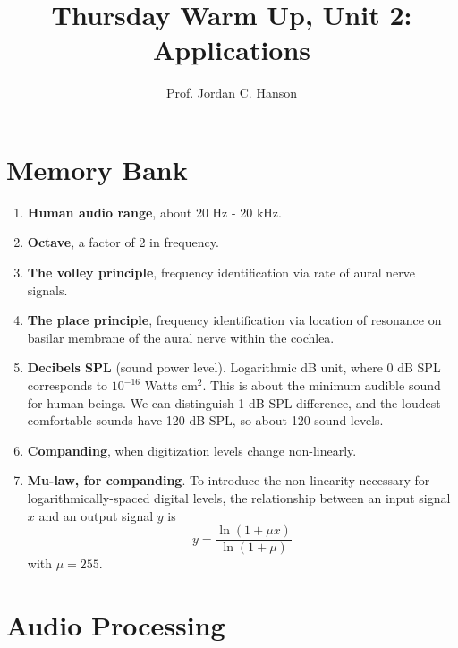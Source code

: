 \documentclass{article}
\begin{document}
\twocolumn
\small

\title{Thursday Warm Up, Unit 2: Applications}
\author{Prof. Jordan C. Hanson}
\maketitle

\section{Memory Bank}

\begin{enumerate}
\item \textbf{Human audio range}, about 20 Hz - 20 kHz.
\item \textbf{Octave}, a factor of 2 in frequency.
\item \textbf{The volley principle}, frequency identification via rate of aural nerve signals.
\item \textbf{The place principle}, frequency identification via location of resonance on basilar membrane of the aural nerve within the cochlea.
\item \textbf{Decibels SPL} (sound power level). Logarithmic dB unit, where 0 dB SPL corresponds to $10^{-16}$ Watts cm$^2$.  This is about the minimum audible sound for human beings.  We can distinguish 1 dB SPL difference, and the loudest comfortable sounds have 120 dB SPL, so about 120 sound levels.
\item \textbf{Companding}, when digitization levels change non-linearly.
\item \textbf{Mu-law, for companding}.  To introduce the non-linearity necessary for logarithmically-spaced digital levels, the relationship between an input signal $x$ and an output signal $y$ is
\begin{equation}
y = \frac{\ln(1+\mu x)}{\ln(1+\mu)}
\end{equation}
with $\mu = 255$.
\end{enumerate}

\section{Audio Processing}
\end{document}
